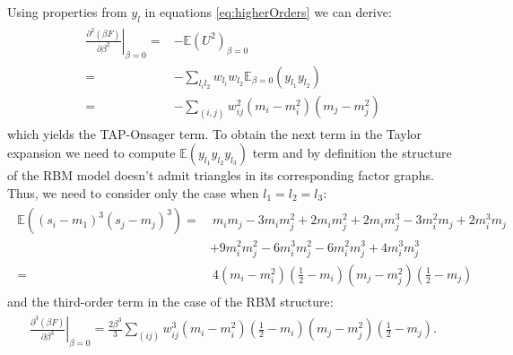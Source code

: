 \documentclass[../report/report.tex]{subfiles}
\begin{document}
Using properties from $y_l$ in equations \ref{eq:higherOrders} we can derive:
\begin{align*}
\begin{split}
\left. \frac{\partial^2 (\beta F)}{\partial \beta^2}\right|_{\beta = 0} = & -\mathbb{E}(U^2)_{\beta =0}\\
= & - \sum_{l_i l_2} w_{l_i}w_{l_2} \mathbb{E}_{\beta = 0} (y_{l_1}y_{l_2} ) \\
= & - \sum_{(i,j)} w_{ij}^2 (m_i-m_i^2)(m_j-m_j^2)
\end{split}
\end{align*}
which yields the TAP-Onsager term. 
To obtain the next term in the Taylor expansion we need to compute $\mathbb{E}(y_{l_1} y_{l_2} y_{l_3})$ term and by definition the structure of the RBM model doesn't admit triangles in its corresponding factor graphs. Thus, we need to consider only the case when $l_1 = l_2 = l_3$:
\begin{align}
\begin{split}
\mathbb{E}((s_i-m_1)^3(s_j-m_j)^3)= & ~m_i m_j -3m_i m_j^2 +2 m_i m_j^2 + 2m_im_j^3 -3 m_i^2 m_j 
 + 2 m_i^3 m_j \\
 & + 9 m_i^2m_j^2 - 6m_i^3 m_j^2 - 6 m_i^2 m_j^3 + 4m_i^3m_j^3 
 \\
  = &~ 4(m_i - m_i^2)(\frac{1}{2} - m_i)(m_j - m_j^2)(\frac{1}{2} - m_j)
 \end{split}
\end{align}
and the third-order term in the case of the RBM structure:
\begin{align*}
\begin{split}
\left. \frac{\partial^3 (\beta F)}{\partial \beta^3}\right|_{\beta = 0} = \frac{2\beta^3}{3} \sum_{(ij)} w_{ij}^3 (m_i - m_i^2)(\frac{1}{2} - m_i)(m_j - m_j^2)(\frac{1}{2} - m_j).
\end{split}
\end{align*}
\end{document}

